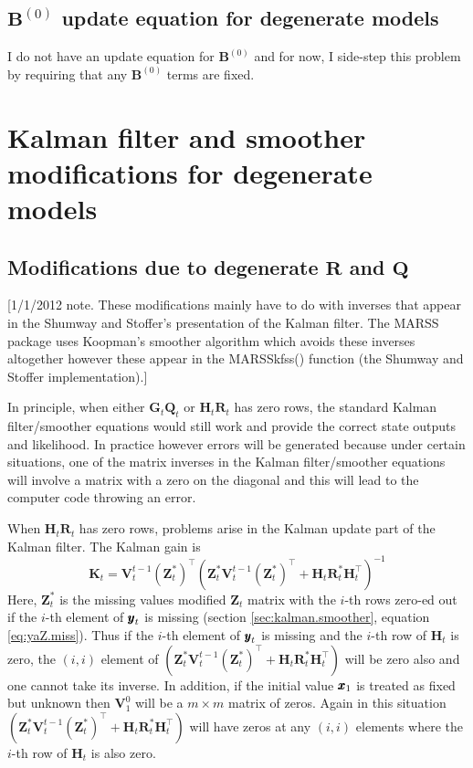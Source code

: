 \documentclass[]{article}
\def\ZZ{\mbox{$\mathbf Z$}}	\def\zz{\mbox{$\mathbf z$}}
\def\BB{\mbox{$\mathbf B$}}	\def\bb{\mbox{$\mathbf b$}}
\def\GG{\mbox{$\mathbf G$}}	\def\gg{\mbox{$\mathbf g$}}
\def\HH{\mbox{$\mathbf H$}}	\def\hh{\mbox{$\mathbf h$}}
\def\KK{\mbox{$\mathbf K$}}
\def\QQ{\mbox{$\mathbf Q$}}	 \def\qq{\mbox{$\mathbf q$}}
\def\RR{\mbox{$\mathbf R$}}	 \def\rr{\mbox{$\mathbf r$}}
\def\VV{\mbox{$\pmb{V}$}}	\def\vv{\mbox{$\pmb{v}$}}
\begin{document}
\subsection{$\BB^{(0)}$ update equation for degenerate models}
I do not have an update equation for $\BB^{(0)}$ and for now, I side-step this problem by requiring that any $\BB^{(0)}$ terms are fixed.

\section{Kalman filter and smoother modifications for degenerate models}

\subsection{Modifications due to degenerate $\RR$ and $\QQ$}
[1/1/2012 note.  These modifications mainly have to do with inverses that appear in the Shumway and Stoffer's presentation of the Kalman filter.  The MARSS package uses Koopman's smoother algorithm which avoids these inverses altogether however these appear in the MARSSkfss() function (the Shumway and Stoffer implementation).]

In principle, when either $\GG_t\QQ_t$ or $\HH_t\RR_t$ has zero rows, the standard Kalman filter/smoother equations would still work and provide the correct state outputs and likelihood.  In practice however errors will be generated because under certain situations, one of the matrix inverses in the Kalman filter/smoother equations will involve a matrix with a zero on the diagonal and this will lead to the computer code throwing an error.  

When $\HH_t\RR_t$ has zero rows, problems arise in the Kalman update part of the Kalman filter.  
The Kalman gain is 
\begin{equation}\label{eq:KKt.2}
\KK_t = \VV_t^{t-1}(\ZZ_t^*)^\top(\ZZ_t^*\VV_t^{t-1}(\ZZ_t^*)^\top + \HH_t\RR_t^*\HH_t^\top)^{-1}
\end{equation}
Here, $\ZZ_t^*$ is the missing values modified $\ZZ_t$ matrix with the $i$-th rows zero-ed out if the $i$-th element of $\mbox{$\pmb{y}$}_t$ is missing (section \ref{sec:kalman.smoother}, equation \ref{eq:yaZ.miss}).  Thus if the $i$-th element of $\mbox{$\pmb{y}$}_t$ is missing and the $i$-th row of $\HH_t$ is zero, the $(i,i)$ element of $(\ZZ_t^*\VV_t^{t-1}(\ZZ_t^*)^\top + \HH_t\RR_t^*\HH_t^\top)$ will be zero also and one cannot take its inverse.  In addition, if the initial value $\mbox{$\pmb{x}$}_1$ is treated as fixed but unknown then $\VV_1^0$ will be a $m \times m$ matrix of zeros.  Again in this situation $(\ZZ_t^*\VV_t^{t-1}(\ZZ_t^*)^\top + \HH_t\RR_t^*\HH_t^\top)$ will have zeros at any $(i,i)$ elements where the $i$-th row of $\HH_t$ is also zero.
\end{document}
